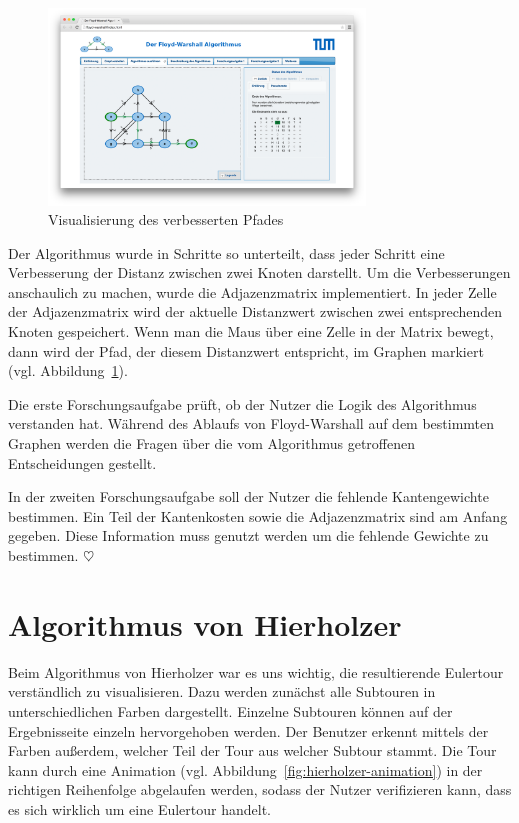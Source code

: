 \begin{figure}[h!]
	\centering
	\includegraphics[width=0.75\textwidth]{figures/fw-matrix}
	\caption[Floyd-Warshall: Matrix]{Visualisierung des verbesserten Pfades}\label{fig:fw-matrix}
\end{figure}

Der Algorithmus wurde in Schritte so unterteilt, dass jeder Schritt eine Verbesserung der Distanz zwischen zwei Knoten darstellt. Um die Verbesserungen anschaulich zu machen, wurde die Adjazenzmatrix implementiert. In jeder Zelle der Adjazenzmatrix wird der aktuelle Distanzwert zwischen zwei entsprechenden Knoten gespeichert. Wenn man die Maus über eine Zelle in der Matrix bewegt, dann wird der Pfad, der diesem Distanzwert entspricht, im Graphen markiert (vgl. Abbildung~\ref{fig:fw-matrix}).

Die erste Forschungsaufgabe prüft, ob der Nutzer die Logik des Algorithmus verstanden hat. Während des Ablaufs von Floyd-Warshall auf dem bestimmten Graphen werden die Fragen über die vom Algorithmus getroffenen Entscheidungen gestellt.

In der zweiten Forschungsaufgabe soll der Nutzer die fehlende Kantengewichte bestimmen. Ein Teil der Kantenkosten sowie die Adjazenzmatrix sind am Anfang gegeben. Diese Information muss genutzt werden um die fehlende Gewichte zu bestimmen. \hfill$\heartsuit$

\section{Algorithmus von Hierholzer} %
Beim Algorithmus von Hierholzer war es uns wichtig, die resultierende Eulertour verständlich zu visualisieren. Dazu werden zunächst alle Subtouren in unterschiedlichen Farben dargestellt. Einzelne Subtouren können auf der Ergebnisseite einzeln hervorgehoben werden. Der Benutzer erkennt mittels der Farben außerdem, welcher Teil der Tour aus welcher Subtour stammt. Die Tour kann durch eine Animation (vgl. Abbildung~\ref{fig:hierholzer-animation}) in der richtigen Reihenfolge abgelaufen werden, sodass der Nutzer verifizieren kann, dass es sich wirklich um eine Eulertour handelt.


